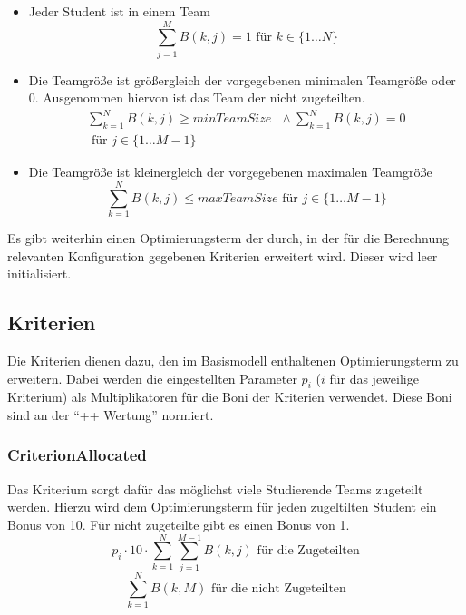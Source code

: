 \documentclass[parskip=full]{scrartcl}
\begin{document}
 \begin{itemize}
   \item Jeder Student ist in einem Team \begin{equation*}
   \sum_{j = 1}^{M} B(k,j) = 1 \text{ für } k \in \{ 1\ldots N \}
   \end{equation*}
   \item Die Teamgröße ist größergleich der vorgegebenen minimalen Teamgröße
   oder 0. Ausgenommen hiervon ist das Team der nicht zugeteilten.
  	\begin{equation*}
  	\begin{split}
  	\sum_{k = 1}^{N} B(k,j)  \ge minTeamSize \text{ } \land \sum_{k = 1}^{N}
  	B(k,j)=0 \\ \text{ für } j \in \{
  	1\ldots M - 1
  	\}
  	\end{split}
  	\end{equation*}
   \item Die Teamgröße ist kleinergleich der vorgegebenen maximalen Teamgröße
   \begin{equation*}
  	\sum_{k = 1}^{N} B(k,j) \le maxTeamSize 
  	 \text{ für } j \in \{
  	1\ldots M - 1
  	\}
  
  	\end{equation*}
 \end{itemize}
 
 Es gibt weiterhin einen Optimierungsterm der durch, in der für die Berechnung
 relevanten Konfiguration gegebenen Kriterien erweitert wird. Dieser wird leer
 initialisiert.


\subsection{Kriterien}
Die Kriterien dienen dazu, den im Basismodell enthaltenen Optimierungsterm zu
erweitern. Dabei werden die eingestellten Parameter $p_i$ ($i$ für das
jeweilige Kriterium) als Multiplikatoren für die Boni der Kriterien verwendet.
Diese Boni sind an der \enquote{++ Wertung} normiert. 

\subsubsection{CriterionAllocated}
Das Kriterium sorgt dafür das möglichst viele Studierende Teams zugeteilt
werden. Hierzu wird dem Optimierungsterm für jeden zugeltilten Student ein Bonus
von 10. Für nicht zugeteilte gibt es einen Bonus von 1. \begin{equation*}
p_i \cdot 10 \cdot \sum_{k = 1}^{N} \sum_{j = 1}^{M-1} B(k,j) \text{ für die
Zugeteilten}
\end{equation*}
\begin{equation*}
\sum_{k = 1}^{N} B(k,M) \text{ für die nicht
Zugeteilten}
\end{equation*}
\end{document}
